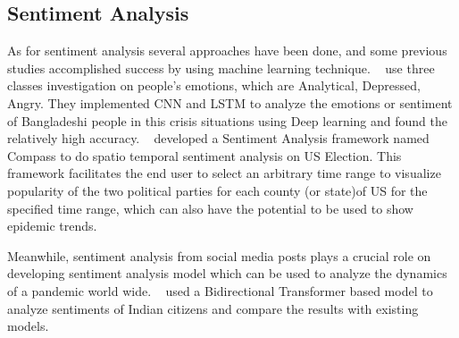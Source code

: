 \subsection{Sentiment Analysis}
As for sentiment analysis several approaches have been done, and some previous
studies accomplished success by using machine learning technique. ~\cite{pran2020analysis} use
three classes investigation on people’s emotions, which are Analytical,
Depressed, Angry. They implemented CNN and LSTM to analyze the emotions
or sentiment of Bangladeshi people in this crisis situations using Deep
learning and found the relatively high accuracy. ~\cite{paul2017compass} developed a Sentiment
Analysis framework named Compass to do spatio temporal sentiment analysis on
US Election. This framework facilitates the end user to select an arbitrary
time range to visualize popularity of the two political parties for each
county (or state)of US for the specified time range, which can also have the
potential to be used to show epidemic trends.

Meanwhile, sentiment analysis from social media posts plays a crucial role on
developing sentiment analysis model which can be used to analyze the dynamics
of a pandemic world wide. ~\cite{chintalapudi2021sentimental} used a Bidirectional Transformer based model
to analyze sentiments of Indian citizens and compare the results with
existing models.

